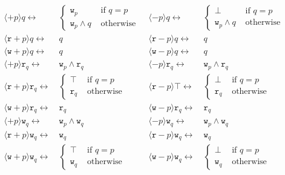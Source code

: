 \documentclass{llncs}
\newcommand{\readable}[1]{\mathtt{r}_{#1}}
\newcommand{\writable}[1]{\mathtt{w}_{#1}}
\newcommand{\assgntopR}[1]{{\mathtt r {+} #1}}
\newcommand{\assgnbotR}[1]{{\mathtt r {-} #1}}
\newcommand{\assgntopW}[1]{{\mathtt w {+} #1}}
\newcommand{\assgnbotW}[1]{{\mathtt w {-} #1}}
\newcommand{\assgntopV}[1]{{\mathtt {+} #1}}
\newcommand{\assgnbotV}[1]{{\mathtt {-} #1}}
\newcommand{\ldia}[1]{ \big\langle #1 \big\rangle}
\newcommand{\leqv}{ \leftrightarrow }
\begin{document}
\begin{table}[t]
\begin{align*}
\ldia{\assgntopV p } q \leqv &\ \begin{cases} 
					\writable{p} 	& \text{ if } q = p \\
					\writable{p} \land q & \text{ otherwise } 
					\end{cases} 
& \ldia{\assgnbotV p } q \leqv &\ \begin{cases} 
					\bot 	& \text{ if } q = p \\
					\writable{p} \land q & \text{ otherwise } 
					\end{cases} 
\\
\ldia{\assgntopR p } q \leqv &\ q
& \ldia{\assgnbotR p } q \leqv &\ q
\\
\ldia{\assgntopW p } q \leqv &\ q
& \ldia{\assgnbotW p } q \leqv &\ q
%
\\
\ldia{\assgntopV p} \readable q \leqv &\  \writable p \land \readable q
& \ldia{\assgnbotV p} \readable q \leqv &\  \writable p \land \readable q
\\
\ldia{\assgntopR p} \readable q \leqv &\ \begin{cases}
								\top & \text{ if } q = p \\
								\readable q & \text{ otherwise }
								\end{cases}
& \ldia{\assgnbotR p} \top \leqv &\ \begin{cases}
								\bot & \text{ if } q = p \\
								\readable q & \text{ otherwise }
								\end{cases}
\\
\ldia{\assgntopW p} \readable q \leqv &\ \readable q
& \ldia{\assgnbotW p} \readable q \leqv &\ \readable q
%
\\
\ldia{\assgntopV p } \writable{q} \leqv &\ \writable{p} \land \writable{q}
& \ldia{\assgnbotV p } \writable{q} \leqv &\ \writable{p} \land \writable{q}
\\
\ldia{\assgntopR p } \writable{q} \leqv &\ \writable{q}
& \ldia{\assgnbotR p } \writable{q} \leqv &\ \writable{q} 
\\
\ldia{\assgntopW p } \writable{q} \leqv &\ \begin{cases}
								\top & \text{ if } q = p \\
								\writable{q} & \text{ otherwise }
								\end{cases}
& \ldia{\assgnbotW p } \writable{q} \leqv &\ \begin{cases}
								\bot & \text{ if } q = p \\
								\writable{q} & \text{ otherwise }
								\end{cases}
\end{align*}
\caption{Reduction axioms for assignments
\label{fig:redax_assignments}
}
\end{table}
\end{document}
